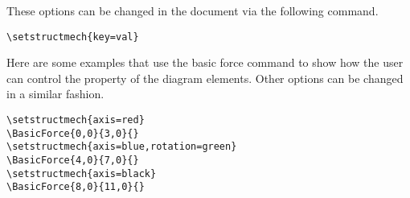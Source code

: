 \documentclass[10pt,a4paper]{article}
\begin{document}
These options can be changed in the document via the following command.
\begin{Verbatim}[frame=single,label=Syntax]
\setstructmech{key=val}
\end{Verbatim}
Here are some examples that use the basic force command to show how the user can control the property of the diagram elements. Other options can be changed in a similar fashion.
\begin{Verbatim}[frame=single,label=Example]
\setstructmech{axis=red}
\BasicForce{0,0}{3,0}{}
\setstructmech{axis=blue,rotation=green}
\BasicForce{4,0}{7,0}{}
\setstructmech{axis=black}
\BasicForce{8,0}{11,0}{}
\end{Verbatim}
\begin{figure}[H]
\centering
{}
\end{figure}
\end{document}
